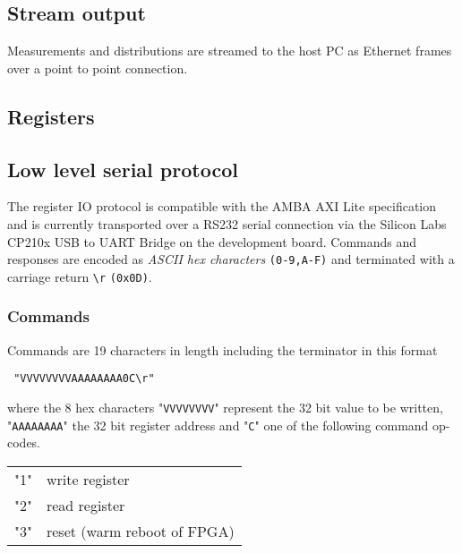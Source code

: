 \documentclass{article}
\newcommand{\code}[1]{\texttt{#1}}
\newenvironment{fielddesc}
{\texttt\bgroup}
{\egroup}
\newcommand{\return}{\code{\textbackslash r}}
\begin{document}
\subsection{Stream output}
Measurements and distributions are streamed to the host PC as Ethernet frames
over a point to point connection. 

%   
% 
%   
% 
%   

\subsection{Registers}


\subsection{Low level serial protocol}

The register IO protocol is compatible with the AMBA AXI Lite specification and
is currently transported over a RS232 serial connection via the Silicon Labs
CP210x USB to UART Bridge on the development board.
Commands and responses are encoded as \emph{ASCII hex characters}
\code{(0-9,A-F)} and terminated with a carriage return \return{} \code{(0x0D)}.

\subsubsection{Commands}

Commands are 19 characters in length including the terminator in this format

\begin{fielddesc}
"VVVVVVVVAAAAAAAA0C\return" 
\end{fielddesc}

where the 8 hex characters "\code{VVVVVVVV}" represent the 32 bit value to be
written, "\code{AAAAAAAA}" the 32 bit register address and "\code{C}" one of the
following command op-codes.

\begin{fielddesc}
\begin{tabular}{l l}
"1" & write register \\
"2" & read register \\
"3" & reset (warm reboot of FPGA)
\end{tabular}
\end{fielddesc} 
\end{document}
